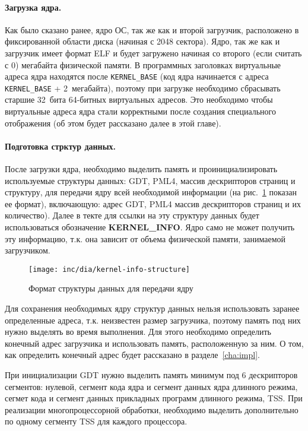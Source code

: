 \paragraph{Загрузка ядра.} Как было сказано ранее, ядро ОС, так же как и второй загрузчик,
расположено в фиксированной области диска (начиная с 2048 сектора). Ядро, так же как и загрузчик
имеет формат ELF и будет загружено начиная со второго (если считать с 0) мегабайта физической
памяти. В программных заголовках виртуальные адреса ядра находятся после \texttt{KERNEL\_BASE} (код
ядра начинается с адреса \texttt{KERNEL\_BASE} + 2~мегабайта), поэтому при загрузке необходимо
сбрасывать старшие 32~бита 64-битных виртуальных адресов. Это необходимо чтобы виртуальные адреса
ядра стали корректными после создания специального отображения (об этом будет рассказано далее в
этой главе).

\paragraph{Подготовка стрктур данных.} После загрузки ядра, необходимо выделить память и проинициализировать
используемые структуры данных: GDT, PML4, массив дескрипторов страниц и структуру, для передачи
ядру всей необходимой информации (на рис.~\ref{fig:kernel-info-structure} показан ее формат), включающую:
адрес GDT, PML4 массив дескрипторов страниц и их количество). Далее в текте для ссылки на эту структуру
данных будет использоваться обозначение \textbf{KERNEL\_INFO}. Ядро само не может получить эту информацию,
т.к. она зависит от объема физической памяти, занимаемой загрузчиком.

\begin{figure}[ht!]
  \centering
  \texttt{[image: inc/dia/kernel-info-structure]}
  \caption{Формат структуры данных для передачи ядру}
  \label{fig:kernel-info-structure}
\end{figure}

Для сохранения необходимых ядру структур данных нельзя использовать заранее определенные адреса,
т.к. неизвестен размер загрузчика, поэтому память под них нужно выделять во время выполнения. Для
этого необходимо определить конечный адрес загрузчика и использовать память, расположенную за ним.
О том, как определить конечный адрес будет рассказано в разделе~\ref{cha:impl}.

При инициализации GDT нужно выделить память минимум под 6 дескрипторов сегментов:
нулевой, сегмент кода ядра и сегмент данных ядра длинного режима, сегмет кода
и сегмент данных прикладных программ длинного режима, TSS. При реализации многопроцессорной
обработки, необходимо выделить дополнительно по одному сегменту TSS для каждого процессора.

